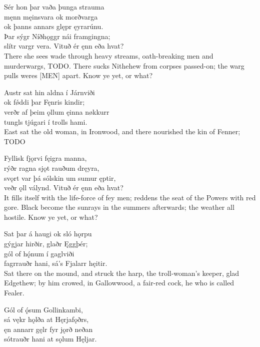 \bva Sér hon þar vaða \hld þunga strauma \\%
męnn męinsvara \hld ok morðvarga \\%
ok þanns annars glępr \hld ęyrarúnu. \\%
Þar sýgr Níðhǫggr \hld nái framgingna; \\%
slítr vargr vera. \hld Vituð ér ęnn eða hvat?\\%

\bvb There she sees wade through heavy streams, oath-breaking men and murderwargs, TODO. There sucks Nithehew from corpses passed-on; the warg pulls weres [MEN] apart. Know ye yet, or what?

\bva Austr sat hin aldna \hld í Járnviði \\%
ok fǿddi þar \hld Fęnris kindir; \\%
verðr af þeim ǫllum \hld ęinna nøkkurr \\%
tungls tjúgari \hld í trolls hami.\\%

\bvb East sat the old woman, in Ironwood, and there nourished the kin of Fenner; TODO

\bva Fyllisk fjǫrvi \hld fęigra manna, \\%
rýðr ragna sjǫt \hld rauðum dręyra, \\%
svǫrt var þá sólskin \hld um sumur ęptir, \\%
veðr ǫll válynd. \hld Vituð ér ęnn eða hvat?\\%

\bvb It fills itself with the life-force of fey men; reddens the seat of the Powers with red gore. Black become the sunrays in the summers afterwards; the weather all hostile. Know ye yet, or what?

\bva Sat þar á haugi \hld ok sló hǫrpu \\%
gýgjar hirðir, \hld glaðr Ęggþér; \\%
gól of hǫ́num \hld í gaglviði \\%
fagrrauðr hani, \hld sá's Fjalarr hęitir.\\%

\bvb Sat there on the mound, and struck the harp, the troll-woman's keeper, glad Edgethew; by him crowed, in Gallowwood, a fair-red cock, he who is called Fealer.

\bva Gól of ǫ́sum \hld Gollinkambi, \\%
sá vękr hǫlða \hld at Hęrjafǫðrs, \\%
ęn annarr gęlr \hld fyr jǫrð neðan \\%
sótrauðr hani \hld at sǫlum Hęljar.\\%

